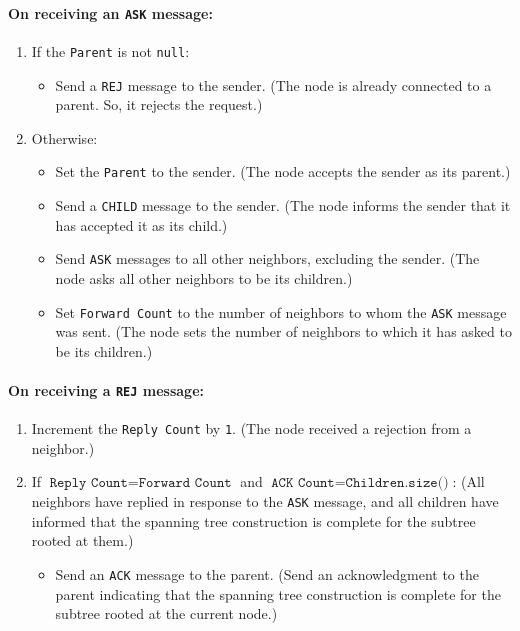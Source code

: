 \paragraph{On receiving an \texttt{ASK} message:}
\begin{enumerate}
    \item If the \texttt{Parent} is not \texttt{null}: 
    \begin{itemize}
        \item Send a \texttt{REJ} message to the sender. (The node is already connected to a parent. So, it rejects the request.)
    \end{itemize}
    \item Otherwise:
    \begin{itemize}
        \item Set the \texttt{Parent} to the sender. (The node accepts the sender as its parent.)
        \item Send a \texttt{CHILD} message to the sender. (The node informs the sender that it has accepted it as its child.)
        \item Send \texttt{ASK} messages to all other neighbors, excluding the sender. (The node asks all other neighbors to be its children.)
        \item Set \texttt{Forward Count} to the number of neighbors to whom the \texttt{ASK} message was sent. (The node sets the number of neighbors to which it has asked to be its children.)
    \end{itemize}
\end{enumerate}

\paragraph{On receiving a \texttt{REJ} message:}
\begin{enumerate}
    \item Increment the \texttt{Reply Count} by \texttt{1}. (The node received a rejection from a neighbor.)    
    \item If \(\texttt{Reply Count} = \texttt{Forward Count}\) and \(\texttt{ACK Count} = \texttt{Children.size()}\): (All neighbors have replied in response to the \texttt{ASK} message, and all children have informed that the spanning tree construction is complete for the subtree rooted at them.)
    \begin{itemize}
        \item Send an \texttt{ACK} message to the parent. (Send an acknowledgment to the parent indicating that the spanning tree construction is complete for the subtree rooted at the current node.)
    \end{itemize}
\end{enumerate}

